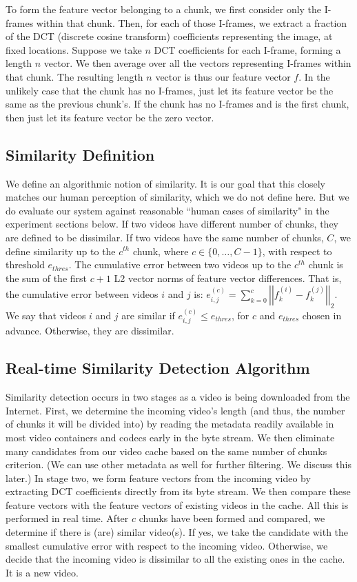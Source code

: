 \documentclass{article}
\begin{document}
To form the feature vector belonging to a chunk, we first consider only the I-frames within that chunk. Then, for each of those I-frames, we extract a fraction of the DCT (discrete cosine transform) coefficients representing the image, at fixed locations. Suppose we take $n$ DCT coefficients for each I-frame, forming a length $n$ vector. We then average over all the vectors representing I-frames within that chunk. The resulting length $n$ vector is thus our feature vector $f$. In the unlikely case that the chunk has no I-frames, just let its feature vector be the same as the previous chunk's. If the chunk has no I-frames and is the first chunk, then just let its feature vector be the zero vector.

\subsection{Similarity Definition}
\label{subsection:Similarity Definition}
We define an algorithmic notion of similarity. It is our goal that this closely matches our human perception of similarity, which we do not define here. But we do evaluate our system against reasonable ``human cases of similarity" in the experiment sections below. If two videos have different number of chunks, they are defined to be dissimilar. If two videos have the same number of chunks, $C$, we define similarity up to the $c^{th}$ chunk, where $c \in \{0, \ldots, C-1\}$, with respect to threshold $e_{thres}$. The cumulative error between two videos up to the $c^{th}$ chunk is the sum of the first $c+1$ L2 vector norms of feature vector differences. That is, the cumulative error between videos $i$ and $j$ is:
$e^{(c)}_{i,j} = \sum_{k=0}^c  \left|\left| f^{(i)}_k - f^{(j)}_k \right|\right|_2$. We say that videos $i$ and $j$ are similar if $e^{(c)}_{i,j} \leq e_{thres}$, for $c$ and $e_{thres}$ chosen in advance. Otherwise, they are dissimilar.

\subsection{Real-time Similarity Detection Algorithm}
\label{subsection:Real-time Similarity Detection Algorithm}
Similarity detection occurs in two stages as a video is being downloaded from the Internet.  First, we determine the incoming video's length (and thus, the number of chunks it will be divided into) by reading the metadata readily available in most video containers and codecs early in the byte stream. We then eliminate many candidates from our video cache based on the same number of chunks criterion. (We can use other metadata as well for further filtering. We discuss this later.) In stage two, we form feature vectors from the incoming video by extracting DCT coefficients directly from its byte stream. We then compare these feature vectors with the feature vectors of existing videos in the cache. All this is performed in real time. After $c$ chunks have been formed and compared, we determine if there is (are) similar video(s). If yes, we take the candidate with the smallest cumulative error with respect to the incoming video. Otherwise, we decide that the incoming video is dissimilar to all the existing ones in the cache. It is a new video.
\end{document}
